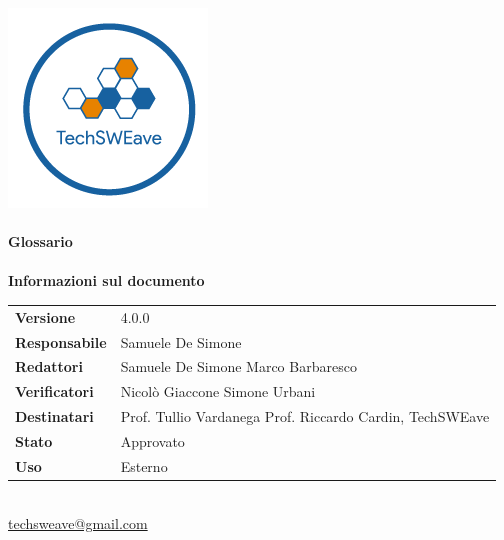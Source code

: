 \documentclass[a4paper]{article}
\begin{document}
\begin{titlepage}
    \begin{center}
        \includegraphics{../../../Images/logo}\\
        \vspace{20px}
        \textcolor{logo}{\hrulefill}\\
        \vspace{20px}
        \textbf{\huge\textcolor{logo}{Glossario}}\\
        \vspace{10px}
        \textcolor{logo}{\hrulefill}\\
        \vspace{40px}
        \textbf{\Large Informazioni sul documento}\\
        \vspace{20px}
        \begin{tabular}{p{100px} | p{100px}}
            \textbf{Versione}     & 4.0.0                                                                      \\
            \textbf{Responsabile} & Samuele De Simone                                                          \\
            \textbf{Redattori}    & Samuele De Simone \newline Marco Barbaresco                                \\
            \textbf{Verificatori} & Nicolò Giaccone \newline Simone Urbani                                     \\
            \textbf{Destinatari}  & Prof. Tullio Vardanega \newline Prof. Riccardo Cardin, \newline TechSWEave \\
            \textbf{Stato}        & Approvato                                                                  \\
            \textbf{Uso}          & Esterno                                                                    \\
        \end{tabular}\\
        \vspace{60px}
        \href{mailto:techsweave@gmail.com}{techsweave@gmail.com}\\

    \end{center}
\end{titlepage}
\end{document}
